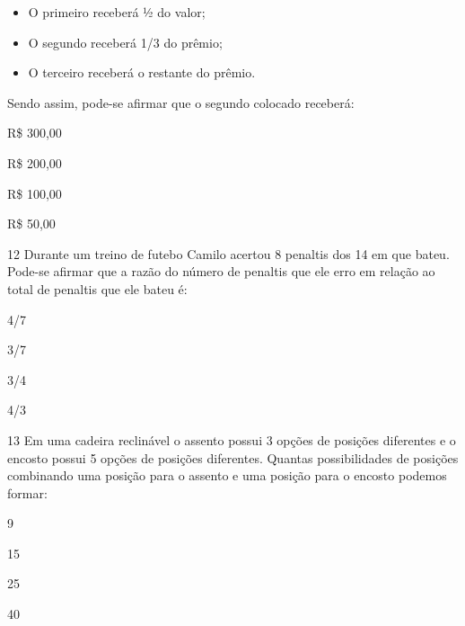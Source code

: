 \begin{itemize}
\item
  O primeiro receberá ½ do valor;
\item
  O segundo receberá 1/3 do prêmio;
\item
  O terceiro receberá o restante do prêmio.
\end{itemize}

Sendo assim, pode-se afirmar que o segundo colocado receberá:

\begin{escolha}
\item
  R\$ 300,00
\item
  R\$ 200,00
\item
  R\$ 100,00
\item
  R\$ 50,00
\end{escolha}


\num{12} Durante um treino de futebo Camilo acertou 8 penaltis dos 14 em
que bateu. Pode-se afirmar que a razão do número de penaltis que ele
erro em relação ao total de penaltis que ele bateu é:

\begin{escolha}
\item
  4/7
\item
  3/7
\item
  3/4
\item
  4/3
\end{escolha}


\num{13} Em uma cadeira reclinável o assento possui 3 opções de posições
diferentes e o encosto possui 5 opções de posições diferentes. Quantas
possibilidades de posições combinando uma posição para o assento e uma
posição para o encosto podemos formar:

\begin{escolha}
\item
  9
\item
  15
\item
  25
\item
  40
\end{escolha}

